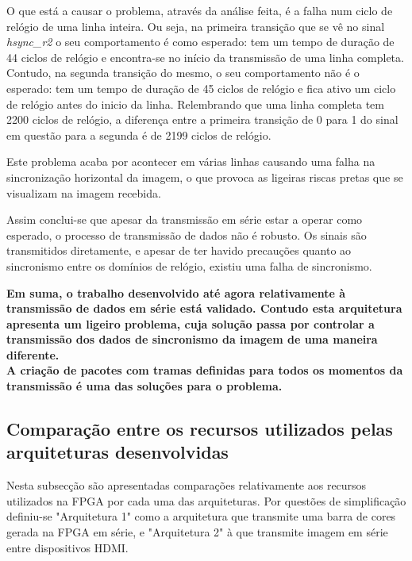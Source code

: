 O que está a causar o problema, através da análise feita, é a falha num ciclo de relógio de uma linha inteira. Ou seja, na primeira transição que se vê no sinal \textit{hsync\_r2} o seu comportamento é como esperado: tem um tempo de duração de 44 ciclos de relógio e encontra-se no início da transmissão de uma linha completa. Contudo, na segunda transição do mesmo, o seu comportamento não é o esperado: tem um tempo de duração de 45 ciclos de relógio e fica ativo um ciclo de relógio antes do inicio da linha. Relembrando que uma linha completa tem 2200 ciclos de relógio, a diferença entre a primeira transição de 0 para 1 do sinal em questão para a segunda é de 2199 ciclos de relógio. 

Este problema acaba por acontecer em várias linhas causando uma falha na sincronização horizontal da imagem, o que provoca as ligeiras riscas pretas que se visualizam na imagem recebida.


Assim conclui-se que apesar da transmissão em série estar a operar como esperado, o processo de transmissão de dados não é robusto. Os sinais são transmitidos diretamente, e apesar de ter havido precauções quanto ao sincronismo entre os domínios de relógio, existiu uma falha de sincronismo.

\begin{center}
	\lrboxbrace[\Vert][\Vert] {} {
\textbf{Em suma, o trabalho desenvolvido até agora relativamente à transmissão de dados em série está validado. Contudo esta arquitetura apresenta um ligeiro problema, cuja solução passa por controlar a transmissão dos dados de sincronismo da imagem de uma maneira diferente. \\ A criação de pacotes com tramas definidas para todos os momentos da transmissão é uma das soluções para o problema.}
}
\end{center}


\subsection{Comparação entre os recursos utilizados pelas arquiteturas desenvolvidas}

Nesta subsecção são apresentadas comparações relativamente aos recursos utilizados na FPGA por cada uma das arquiteturas. Por questões de simplificação definiu-se "Arquitetura 1" como a arquitetura que transmite uma barra de cores gerada na FPGA em série, e "Arquitetura 2" à que transmite imagem em série entre dispositivos HDMI.


